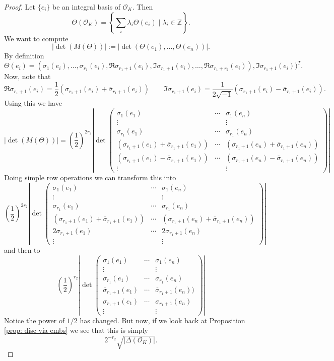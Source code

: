 \documentclass[11pt,a4paper]{report}
\theoremstyle{plain}
\theoremstyle{definition}
\theoremstyle{definition}
\newcommand{\ZZ}{\mathbb{Z}}
\def \s {\sigma}
\def \lam {\lambda}
\def \OO {\mathcal{O}}
\def \s {\sigma}
\def \ov{\overline}
\begin{document}
\begin{proof}
	Let $\{e_i\}$ be an integral basis of $\OO_K$. Then \[\Theta(\OO_K)=\left \{\sum_i \lam_i \Theta(e_i) \mid \lam_i \in \ZZ \right \}.\] We want to compute \[|\det(M(\Theta))|:=|\det(\Theta(e_1),\dots,\Theta(e_n))| .\] By definition \[\Theta(e_i)=(\s_1(e_i),\dots,\s_{r_1}(e_i),\Re \s_{r_1+1}(e_i),\Im\s_{r_1+1}(e_i), \dots,\Re \s_{r_1+r_2}(e_i)), \Im \s_{r_1+1}(e_i)             )^T.\] Now, note that \[\Re \s_{r_1+1}(e_i)=\frac{1}{2}(\s_{r_1+1}(e_i) + \ov{\s}_{r_1+1}(e_i)) \qquad \Im \s_{r_1+1}(e_i)=\frac{1}{2\sqrt{-1}}(\s_{r_1+1}(e_i) - \ov{\s}_{r_1+1}(e_i)).\] Using this we have \[|\det(M(\Theta))|= \left (\frac{1}{2} \right )^{2r_2} \left | \det \left (\begin{matrix} \sigma_1(e_1) &\cdots& \sigma_1(e_n)\\ \vdots & & \vdots \\  \sigma_{r_1}(e_1) &\cdots& \sigma_{r_1}(e_n) \\  (\s_{r_1+1}(e_1) + \ov{\s}_{r_1+1}(e_1)) &\cdots& (\s_{r_1+1}(e_n) + \ov{\s}_{r_1+1}(e_n)) \\(\s_{r_1+1}(e_1) - \ov{\s}_{r_1+1}(e_1)) &\cdots& (\s_{r_1+1}(e_n) - \ov{\s}_{r_1+1}(e_n))\\ \vdots && \vdots
	\end{matrix} \right ) \right |     \] Doing simple row operations we can transform this into \[\left (\frac{1}{2} \right )^{2r_2} \left | \det \left (\begin{matrix} \sigma_1(e_1) &\cdots& \sigma_1(e_n)\\ \vdots & & \vdots \\  \sigma_{r_1}(e_1) &\cdots& \sigma_{r_1}(e_n) \\  (\s_{r_1+1}(e_1) + \ov{\s}_{r_1+1}(e_1)) &\cdots& (\s_{r_1+1}(e_n) + \ov{\s}_{r_1+1}(e_n)) \\2\s_{r_1+1}(e_1) &\cdots& 2\s_{r_1+1}(e_n)\\ \vdots && \vdots
	\end{matrix} \right ) \right |     \] and then to\[\left (\frac{1}{2} \right )^{r_2} \left | \det \left (\begin{matrix} \sigma_1(e_1) &\cdots& \sigma_1(e_n)\\ \vdots & & \vdots \\  \sigma_{r_1}(e_1) &\cdots& \sigma_{r_1}(e_n) \\   \ov{\s}_{r_1+1}(e_1) &\cdots&  \ov{\s}_{r_1+1}(e_n)) \\\s_{r_1+1}(e_1) &\cdots& \s_{r_1+1}(e_n)\\ \vdots && \vdots
	\end{matrix} \right ) \right |     \] Notice the power of $1/2$ has changed. But now, if we look back at Proposition \ref{prop: disc via embs} we see that this is simply \[2^{-r_2} \sqrt{|\Delta(\OO_K)|}.\]
	

\end{proof}
\end{document}
